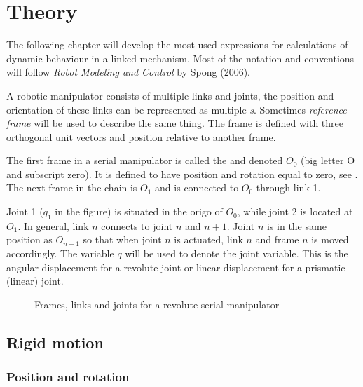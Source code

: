 \vspace{-0.9cm}
\chapter{Theory}\label{secTheory}

\vspace{-0.8cm}

The following chapter will develop the most used expressions for calculations of dynamic behaviour in a linked mechanism. Most of the notation and conventions will follow \textit{Robot Modeling and Control} by Spong (2006)\cite{spong}. 

A robotic manipulator consists of multiple links and joints, the position and orientation of these links can be represented as multiple \textit{s}. Sometimes \textit{reference frame} will be used to describe the same thing. The frame is defined with three orthogonal unit vectors and position relative to another frame.

The first frame in a serial manipulator is called the  and denoted $O_0$ (big letter O and subscript zero). It is defined to have position and rotation equal to zero, see . The next frame in the chain is $O_1$ and is connected to $O_0$ through link 1.

Joint 1 ($q_1$ in the figure) is situated in the origo of $O_0$, while joint 2 is located at $O_1$. In general, link $n$ connects to joint $n$ and $n+1$. Joint $n$ is in the same position as $O_{n-1}$ so that when joint $n$ is actuated, link $n$ and frame $n$ is moved accordingly. The variable $q$ will be used to denote the joint variable. This is the angular displacement for a revolute joint or linear displacement for a prismatic (linear) joint.

\begin{figure}[h!]    
    \centering           
    \def\svgwidth{.7\columnwidth}
    
    \caption{Frames, links and joints for a revolute serial manipulator}
    \label{frames}
\end{figure}
\restoregeometry


\section{Rigid motion}
\subsection{Position and rotation}

